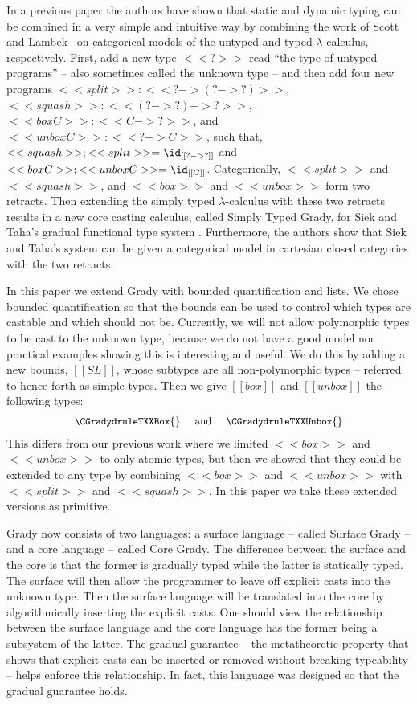 In a previous paper the authors \cite{Eades:2017} have shown that
static and dynamic typing can be combined in a very simple and
intuitive way by combining the work of Scott~\cite{Scott:1980} and
Lambek~\cite{Lambek:1980} on categorical models of the untyped and
typed $\lambda$-calculus, respectively.  First, add a new type $<<?>>$
read ``the type of untyped programs'' -- also sometimes called the
unknown type -- and then add four new programs
$<<split>> : <<? -> (? -> ?)>>$, $ <<squash>> : <<(? -> ?) -> ?>> $,
$<<box C>> : <<C -> ?>>$, and $<<unbox C>> : <<? -> C>>$, such that,
$<<squash>>;<<split>> = \id_{[[? -> ?]]}$ and
$<<box C>>;<<unbox C>> = \id_{[[C]]}$.
Categorically, $<<split>>$ and $<<squash>>$, and $<<box>>$ and
$<<unbox>>$ form two retracts.  Then extending the simply typed
$\lambda$-calculus with these two retracts results in a new core
casting calculus, called Simply Typed Grady, for Siek and Taha's
gradual functional type system \cite{Siek:2015}.  Furthermore, the
authors show that Siek and Taha's system can be given a categorical
model in cartesian closed categories with the two retracts.

In this paper we extend Grady with bounded quantification and lists.
We chose bounded quantification so that the bounds can be used to
control which types are castable and which should not be.  Currently,
we will not allow polymorphic types to be cast to the unknown type,
because we do not have a good model nor practical examples showing
this is interesting and useful.  We do this by adding a new bounds,
$[[SL]]$, whose subtypes are all non-polymorphic types -- referred to
hence forth as simple types.  Then we give $[[box]]$ and $[[unbox]]$
the following types:
\[\small
\begin{array}{lll}
  \CGradydruleTXXBox{} & \text{ and } & \CGradydruleTXXUnbox{}
\end{array}
\]
This differs from our previous work where we limited $<<box>>$ and
$<<unbox>>$ to only atomic types, but then we showed that they could
be extended to any type by combining $<<box>>$ and $<<unbox>>$ with
$<<split>>$ and $<<squash>>$.  In this paper we take these extended
versions as primitive.

Grady now consists of two languages: a surface language -- called
Surface Grady -- and a core language -- called Core Grady. The
difference between the surface and the core is that the former is
gradually typed while the latter is statically typed.  The surface
will then allow the programmer to leave off explicit casts into the
unknown type.  Then the surface language will be translated into the
core by algorithmically inserting the explicit casts.  One should view
the relationship between the surface language and the core language
has the former being a subsystem of the latter.  The gradual guarantee
-- the metatheoretic property that shows that explicit casts can be
inserted or removed without breaking typeability -- helps enforce this
relationship.  In fact, this language was designed so that the gradual
guarantee holds.

